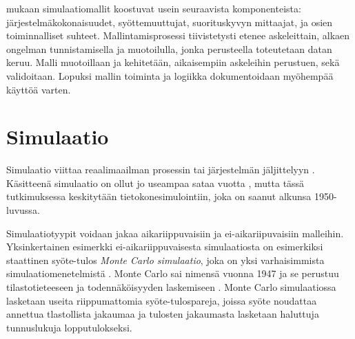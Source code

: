 \documentclass[utf8]{gradu3}
\begin{document}
\textcite{maria1997introduction} mukaan simulaatiomallit koostuvat usein seuraavista komponenteista: järjestelmäkokonaisuudet, syöttemuuttujat, suorituskyvyn mittaajat,
ja osien toiminnalliset suhteet. Mallintamisprosessi tiivistetysti etenee askeleittain, alkaen ongelman tunnistamisella ja muotoilulla, 
jonka perusteella toteutetaan datan keruu. Malli muotoillaan ja kehitetään, 
aikaisempiin askeleihin perustuen, sekä validoitaan. Lopuksi mallin toiminta ja logiikka dokumentoidaan myöhempää käyttöä varten.

\section{Simulaatio} \label{simulaatio}
Simulaatio viittaa reaalimaailman prosessin tai 
järjestelmän jäljittelyyn \parencite{banks1999introduction}. 
Käsitteenä simulaatio on ollut jo useampaa sataa vuotta 
\parencite{HistoryOfSimulation}, 
mutta tässä tutkimuksessa keskitytään tietokonesimulointiin, 
joka on saanut alkunsa 1950-luvussa. 
%
\parencites%
    {HistoryOfSimulation}%
    {historyOfSimulation1996}
\relax

Simulaatiotyypit voidaan jakaa aikariippuvaisiin ja ei-aikariipuvaisiin malleihin.
Yksinkertainen esimerkki ei-aikariippuvaisesta simulaatiosta on esimerkiksi staattinen 
syöte-tulos
\textit{Monte Carlo simulaatio}, joka on yksi varhaisimmista simulaatiomenetelmistä
\parencites%
    {historyOfSimulation1996}%
    {historyOfMonte}
\relax
%
. 
Monte Carlo sai nimensä vuonna 1947 \parencite{historyOfMonte}
ja se perustuu tilastotieteeseen ja todennäköisyyden laskemiseen
\parencite{historyOfSimulation1996}.
Monte Carlo simulaatiossa lasketaan useita riippumattomia syöte-tulospareja,
joissa syöte noudattaa annettua tlastollista jakaumaa 
ja tulosten jakaumasta lasketaan haluttuja tunnuslukuja lopputulokseksi.

\end{document}
